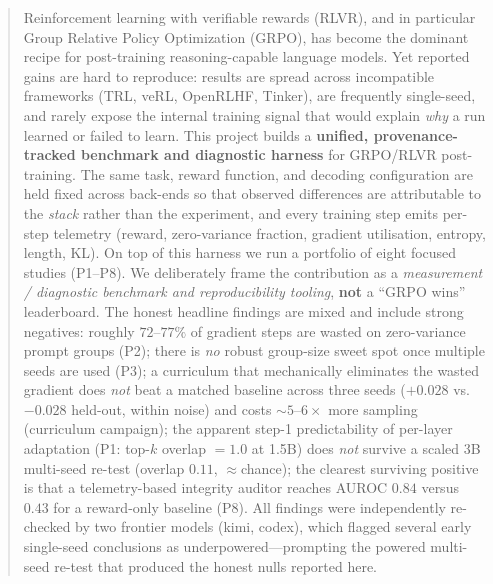 \documentclass[12pt,a4paper]{report}
\begin{document}
\clearpage
{}
\setcounter{page}{1}
\tableofcontents
\clearpage
{}
\setcounter{page}{1}


\begin{abstract}
\noindent
Reinforcement learning with verifiable rewards (RLVR), and in particular Group
Relative Policy Optimization (GRPO), has become the dominant recipe for
post-training reasoning-capable language models. Yet reported gains are hard to
reproduce: results are spread across incompatible frameworks (TRL, veRL,
OpenRLHF, Tinker), are frequently single-seed, and rarely expose the internal
training signal that would explain \emph{why} a run learned or failed to learn.
This project builds a \textbf{unified, provenance-tracked benchmark and diagnostic
harness} for GRPO/RLVR post-training. The same task, reward function, and
decoding configuration are held fixed across back-ends so that observed
differences are attributable to the \emph{stack} rather than the experiment, and
every training step emits per-step telemetry (reward, zero-variance fraction,
gradient utilisation, entropy, length, KL). On top of this harness we run a
portfolio of eight focused studies (P1--P8). We deliberately frame the
contribution as a \emph{measurement / diagnostic benchmark and reproducibility
tooling}, \textbf{not} a ``GRPO wins'' leaderboard. The honest headline findings
are mixed and include strong negatives: roughly $72$--$77\%$ of gradient steps
are wasted on zero-variance prompt groups (P2); there is \emph{no} robust
group-size sweet spot once multiple seeds are used (P3); a curriculum that
mechanically eliminates the wasted gradient does \emph{not} beat a matched
baseline across three seeds ($+0.028$ vs.\ $-0.028$ held-out, within noise) and
costs ${\sim}5$--$6\times$ more sampling (curriculum campaign); the apparent
step-1 predictability of per-layer adaptation (P1: top-$k$ overlap $=1.0$ at 1.5B)
does \emph{not} survive a scaled 3B multi-seed re-test (overlap $0.11$, ${\approx}$chance);
the clearest surviving positive is that a telemetry-based integrity
auditor reaches AUROC $0.84$ versus $0.43$ for a reward-only baseline (P8). All
findings were independently re-checked by two frontier models (kimi, codex),
which flagged several early single-seed conclusions as underpowered---prompting
the powered multi-seed re-test that produced the honest nulls reported here.
\end{abstract}
\end{document}
